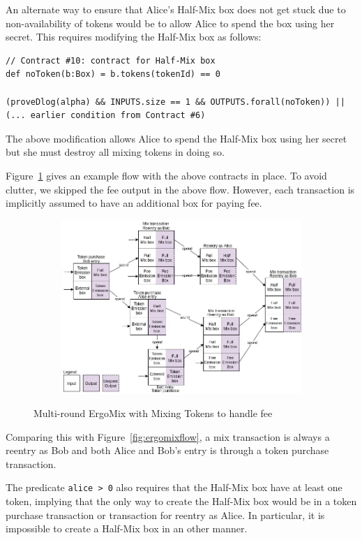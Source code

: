 \documentclass[runningheads]{llncs}
\newcommand{\mixname}{ErgoMix\xspace}
\begin{document}
An alternate way to ensure that Alice's Half-Mix box does not get stuck due to non-availability of tokens would be to allow Alice to spend the box using her secret. This requires modifying the Half-Mix box as follows:

{\small
\begin{Verbatim}[frame=single]
// Contract #10: contract for Half-Mix box
def noToken(b:Box) = b.tokens(tokenId) == 0

(proveDlog(alpha) && INPUTS.size == 1 && OUTPUTS.forall(noToken)) || 
(... earlier condition from Contract #6)
\end{Verbatim}
}

The above modification allows Alice to spend the Half-Mix box using her secret but she must destroy all mixing tokens in doing so. 

Figure~\ref{fig:mixingtokens} gives an example flow with the above contracts in place. To avoid clutter, we skipped the fee output in the above flow. However, each transaction is implicitly assumed to have an additional box for paying fee.

\begin{figure}[h]
	\centering
	\begin{subfigure}{0.9\textwidth}
		\centering
		\includegraphics[width=\linewidth]{MixingTokens.jpg}
	\end{subfigure}
	\caption{Multi-round \mixname with Mixing Tokens to handle fee}
\label{fig:mixingtokens}
\end{figure}

Comparing this with Figure~\ref{fig:ergomixflow}, a mix transaction is always a reentry as Bob and both Alice and Bob's entry is through a token purchase transaction. 

The predicate \texttt{alice > 0} also requires that the Half-Mix box have at least one token, implying that the only way to create the Half-Mix box would be in a token purchase transaction or transaction for reentry as Alice. In particular, it is impossible to create a Half-Mix box in an other manner.



\end{document}
